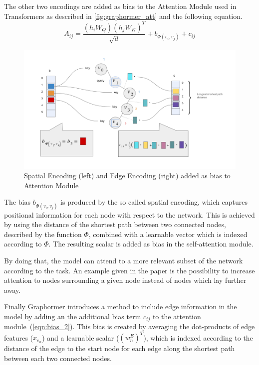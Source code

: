 The other two encodings are added as bias to the Attention Module used in Transformers as described in \autoref{fig:graphormer_att} and the following equation.
\begin{equation}
    A_{ij} = \frac{(h_i W_Q)(h_j W_K)^T}{\sqrt{d}} + b_{\Phi (v_i, v_j)} + c_{ij}
    \label{eqn:attention-matrix}
\end{equation}

\begin{figure}[h!]
    \centering
    \includegraphics[scale=0.35]{tex/res/graphormer_attention.png}
    \caption{Spatial Encoding (left) and Edge Encoding (right) added as bias to Attention Module}
    \label{fig:graphormer_att}
\end{figure}

The bias $b_{\Phi (v_i, v_j)}$ is produced by the so called spatial encoding, which captures positional information for each node with respect to the network. This is achieved by using the distance of the shortest path between two connected nodes, described by the function $\Phi$, combined with a learnable vector which is indexed according to $\Phi$. The resulting scalar is added as bias in the self-attention module.

By doing that, the model can attend to a more relevant subset of the network according to the task. An example given in the paper is the possibility to increase attention to nodes surrounding a given node instead of nodes which lay further away.

Finally Graphormer introduces a method to include edge information in the model by adding an the additional bias term $c_{ij}$ to the attention module~(\autoref{eqn:bias_2}). This bias is created by averaging the dot-products of edge features ($x_{e_n}$) and a learnable scalar ($(w_n^E)^T$), which is indexed according to the distance of the edge to the start node for each edge along the shortest path between each two connected nodes.

